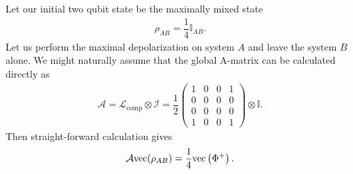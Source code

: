 \documentclass[12pt]{iopart}
\begin{document}
Let our initial two qubit state be the maximally mixed state
\begin{align}
    \rho_{AB}=\dfrac{1}{4}\mathbb{I}_{AB}.
\end{align}
Let us perform the maximal depolarization on system $A$ and leave the system $B$ alone. We might naturally assume that the global A-matrix can be calculated directly as
\begin{align}
    \mathcal{A}=\mathcal{L}_\text{comp}\otimes\mathcal{I}=
    \dfrac{1}{2}\begin{pmatrix}
    1 & 0 & 0 & 1\\
    0 & 0 & 0 & 0\\
    0 & 0 & 0 & 0\\
    1 & 0 & 0 & 1
    \end{pmatrix} \otimes
    \mathbb{I}.
\end{align}
Then straight-forward calculation gives
\begin{align}
    \notag\mathcal{A}\text{vec}(\rho_{AB})=\dfrac{1}{4}\text{vec}\left(\Phi^+\right).
\end{align}
\end{document}
